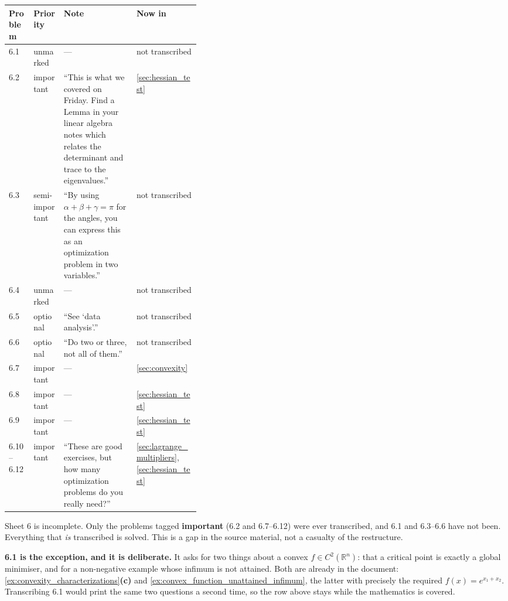 \begin{center}
\begin{tabular}{@{}l l p{0.38\linewidth} l@{}}
\textbf{Problem} & \textbf{Priority} & \textbf{Note} & \textbf{Now in} \\
\hline
6.1 & unmarked & --- & not transcribed \\[3pt]
6.2 & important & ``This is what we covered on Friday. Find a Lemma in your linear algebra
  notes which relates the determinant and trace to the eigenvalues.'' & \cref{sec:hessian_test} \\[3pt]
6.3 & semi-important & ``By using $\alpha+\beta+\gamma=\pi$ for the angles, you can express
  this as an optimization problem in two variables.'' & not transcribed \\[3pt]
6.4 & unmarked & --- & not transcribed \\[3pt]
6.5 & optional & ``See `data analysis'.'' & not transcribed \\[3pt]
6.6 & optional & ``Do two or three, not all of them.'' & not transcribed \\[3pt]
6.7 & important & --- & \cref{sec:convexity} \\[3pt]
6.8 & important & --- & \cref{sec:hessian_test} \\[3pt]
6.9 & important & --- & \cref{sec:hessian_test} \\[3pt]
6.10--6.12 & important & ``These are good exercises, but how many optimization problems do
  you really need?'' & \cref{sec:lagrange_multipliers}, \cref{sec:hessian_test} \\
\end{tabular}
\end{center}

\begin{ainote}
Sheet 6 is incomplete. Only the problems tagged \textbf{important} (6.2 and 6.7--6.12)
were ever transcribed, and 6.1 and 6.3--6.6 have not been. Everything that \emph{is} transcribed
is solved. This is a gap in the source material, not a casualty of the restructure.

\textbf{6.1 is the exception, and it is deliberate.} It asks for two things about a convex
$f \in C^2(\mathbb{R}^n)$: that a critical point is exactly a global minimiser, and for a
non-negative example whose infimum is not attained. Both are already in the document:
\cref{ex:convexity_characterizations}\textbf{(c)} and
\cref{ex:convex_function_unattained_infimum}, the latter with precisely the required
$f(x) = e^{x_1+x_2}$. Transcribing 6.1 would print the same two questions a second time, so the
row above stays  while the mathematics is covered.
\end{ainote}

